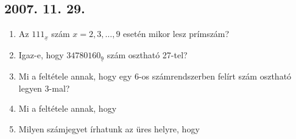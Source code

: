 \subsection*{2007. 11. 29.}
\begin{enumerate}
\item Az $111_{\underline{x}}$ szám $x=2, 3, \ldots , 9$ esetén mikor lesz prímszám?
\item Igaz-e, hogy $34780160_{\underline{9}}$ szám osztható 27-tel?
\item Mi a feltétele annak, hogy egy 6-os számrendszerben felírt szám osztható legyen 3-mal?
\item Mi a feltétele annak, hogy
\item Milyen számjegyet írhatunk az üres helyre, hogy
\end{enumerate}



